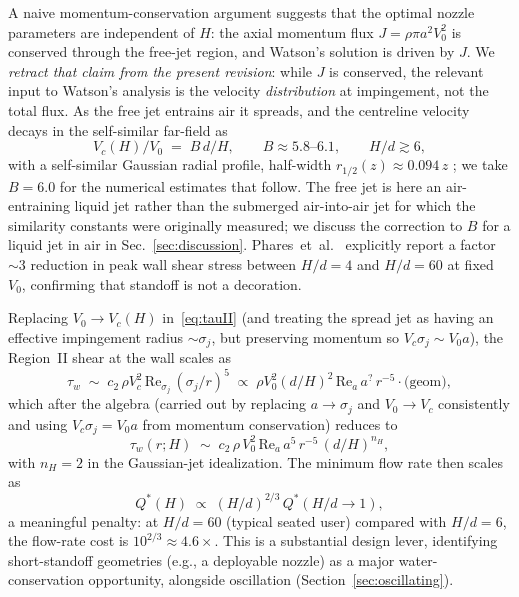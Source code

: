 \documentclass[10pt,letterpaper]{article}
\newcommand{\Rey}{\mathrm{Re}}
\begin{document}
A naive momentum-conservation argument suggests that the optimal nozzle
parameters are independent of $H$: the axial momentum flux
$J = \rho \pi a^2 V_0^2$ is conserved through the free-jet region, and
Watson's solution is driven by $J$. We \emph{retract that claim from the
present revision}: while $J$ is conserved, the relevant input to Watson's
analysis is the velocity \emph{distribution} at impingement, not the
total flux. As the free jet entrains air it spreads, and the centreline
velocity decays in the self-similar far-field
\citep{HusseinCappGeorge1994,PopeBook} as
\begin{equation}
  V_c(H)/V_0 \;=\; B\,d/H, \qquad B \approx 5.8\text{--}6.1,
  \qquad H/d \gtrsim 6,
  \label{eq:Vcjet}
\end{equation}
with a self-similar Gaussian radial profile, half-width
$r_{1/2}(z) \approx 0.094\,z$
\citep{HusseinCappGeorge1994,PopeBook}; we take $B = 6.0$ for the
numerical estimates that follow. The free jet is here an air-entraining
liquid jet rather than the submerged air-into-air jet for which the
similarity constants were originally measured; we discuss the
correction to $B$ for a liquid jet in air in Sec.~\ref{sec:discussion}.
Phares~et~al.~\citep{Phares2000} explicitly report a factor $\sim 3$
reduction in peak wall shear stress between $H/d = 4$ and $H/d = 60$ at
fixed $V_0$, confirming that standoff is not a decoration.

Replacing $V_0 \to V_c(H)$ in~\eqref{eq:tauII} (and treating the spread
jet as having an effective impingement radius $\sim \sigma_j$, but
preserving momentum so $V_c \sigma_j \sim V_0 a$), the Region~II shear
at the wall scales as
\begin{equation}
  \tau_w \;\sim\; c_2\,\rho V_c^2\,\Rey_{\sigma_j}\,(\sigma_j/r)^5
  \;\propto\; \rho V_0^2 (d/H)^{2}\,\Rey_a\,a^{?}\,r^{-5} \cdot \text{(geom)},
\end{equation}
which after the algebra (carried out by replacing $a \to \sigma_j$ and
$V_0 \to V_c$ consistently and using $V_c \sigma_j = V_0 a$ from
momentum conservation) reduces to
\begin{equation}
  \tau_w(r;H) \;\sim\; c_2\,\rho\,V_0^2\,\Rey_a\,a^5\,r^{-5}\,(d/H)^{n_H},
  \label{eq:tauIIH}
\end{equation}
with $n_H = 2$ in the Gaussian-jet idealization. The minimum flow rate
then scales as
\begin{equation}
  Q^*(H) \;\propto\; (H/d)^{2/3}\,Q^*(H/d \to 1),
  \label{eq:QstarH}
\end{equation}
a meaningful penalty: at $H/d = 60$ (typical seated user) compared with
$H/d = 6$, the flow-rate cost is $10^{2/3} \approx 4.6\times$. This is a
substantial design lever, identifying short-standoff geometries (e.g., a
deployable nozzle) as a major water-conservation opportunity, alongside
oscillation (Section~\ref{sec:oscillating}).
\end{document}
